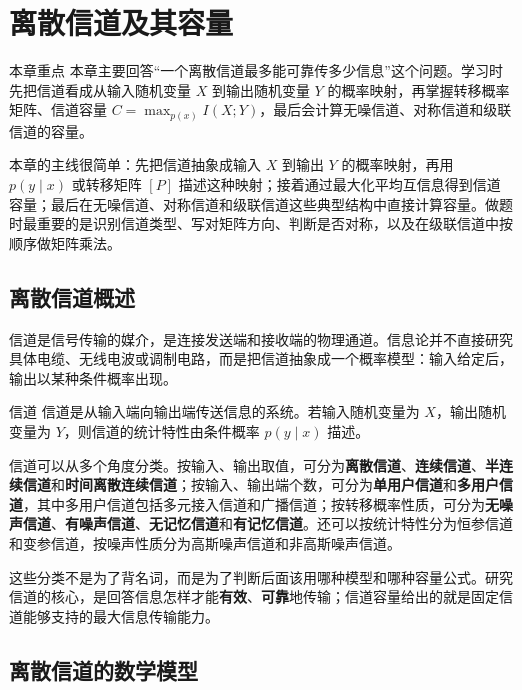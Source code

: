 \section{离散信道及其容量}

\begin{remarkBox}{本章重点}
本章主要回答“一个离散信道最多能可靠传多少信息”这个问题。学习时先把信道看成从输入随机变量 $X$ 到输出随机变量 $Y$ 的概率映射，再掌握转移概率矩阵、信道容量 $C=\max_{p(x)}I(X;Y)$，最后会计算无噪信道、对称信道和级联信道的容量。
\end{remarkBox}

本章的主线很简单：先把信道抽象成输入 $X$ 到输出 $Y$ 的概率映射，再用 $p(y\mid x)$ 或转移矩阵 $[P]$ 描述这种映射；接着通过最大化平均互信息得到信道容量；最后在无噪信道、对称信道和级联信道这些典型结构中直接计算容量。做题时最重要的是识别信道类型、写对矩阵方向、判断是否对称，以及在级联信道中按顺序做矩阵乘法。

\subsection{离散信道概述}

信道是信号传输的媒介，是连接发送端和接收端的物理通道。信息论并不直接研究具体电缆、无线电波或调制电路，而是把信道抽象成一个概率模型：输入给定后，输出以某种条件概率出现。

\begin{definitionBox}{信道}
信道是从输入端向输出端传送信息的系统。若输入随机变量为 $X$，输出随机变量为 $Y$，则信道的统计特性由条件概率 $p(y\mid x)$ 描述。
\end{definitionBox}

信道可以从多个角度分类。按输入、输出取值，可分为\textbf{离散信道}、\textbf{连续信道}、\textbf{半连续信道}和\textbf{时间离散连续信道}；按输入、输出端个数，可分为\textbf{单用户信道}和\textbf{多用户信道}，其中多用户信道包括多元接入信道和广播信道；按转移概率性质，可分为\textbf{无噪声信道}、\textbf{有噪声信道}、\textbf{无记忆信道}和\textbf{有记忆信道}。还可以按统计特性分为恒参信道和变参信道，按噪声性质分为高斯噪声信道和非高斯噪声信道。

这些分类不是为了背名词，而是为了判断后面该用哪种模型和哪种容量公式。研究信道的核心，是回答信息怎样才能\textbf{有效}、\textbf{可靠}地传输；信道容量给出的就是固定信道能够支持的最大信息传输能力。

\subsection{离散信道的数学模型}

